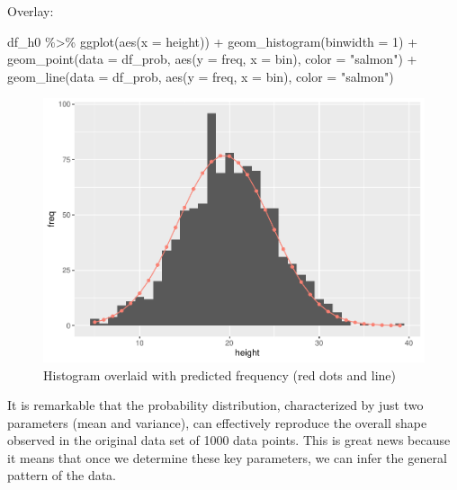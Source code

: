 \documentclass[
]{book}
\newenvironment{Shaded}{\begin{snugshade}}{\end{snugshade}}
\newcommand{\AttributeTok}[1]{\textcolor[rgb]{0.77,0.63,0.00}{#1}}
\newcommand{\DecValTok}[1]{\textcolor[rgb]{0.00,0.00,0.81}{#1}}
\newcommand{\FunctionTok}[1]{\textcolor[rgb]{0.00,0.00,0.00}{#1}}
\newcommand{\NormalTok}[1]{#1}
\newcommand{\SpecialCharTok}[1]{\textcolor[rgb]{0.00,0.00,0.00}{#1}}
\newcommand{\StringTok}[1]{\textcolor[rgb]{0.31,0.60,0.02}{#1}}
\begin{document}
Overlay:

\begin{Shaded}
\begin{Highlighting}[]
\NormalTok{df\_h0 }\SpecialCharTok{\%\textgreater{}\%} 
  \FunctionTok{ggplot}\NormalTok{(}\FunctionTok{aes}\NormalTok{(}\AttributeTok{x =}\NormalTok{ height)) }\SpecialCharTok{+} 
  \FunctionTok{geom\_histogram}\NormalTok{(}\AttributeTok{binwidth =} \DecValTok{1}\NormalTok{) }\SpecialCharTok{+}
  \FunctionTok{geom\_point}\NormalTok{(}\AttributeTok{data =}\NormalTok{ df\_prob,}
             \FunctionTok{aes}\NormalTok{(}\AttributeTok{y =}\NormalTok{ freq,}
                 \AttributeTok{x =}\NormalTok{ bin),}
             \AttributeTok{color =} \StringTok{"salmon"}\NormalTok{) }\SpecialCharTok{+}
  \FunctionTok{geom\_line}\NormalTok{(}\AttributeTok{data =}\NormalTok{ df\_prob,}
            \FunctionTok{aes}\NormalTok{(}\AttributeTok{y =}\NormalTok{ freq,}
                \AttributeTok{x =}\NormalTok{ bin),}
            \AttributeTok{color =} \StringTok{"salmon"}\NormalTok{)}
\end{Highlighting}
\end{Shaded}

\begin{figure}

{\centering \includegraphics{_main_files/figure-latex/histogram-overlaid-1} 

}

\caption{Histogram overlaid with predicted frequency (red dots and line)}\label{fig:histogram-overlaid}
\end{figure}

It is remarkable that the probability distribution, characterized by just two parameters (mean and variance), can effectively reproduce the overall shape observed in the original data set of 1000 data points. This is great news because it means that once we determine these key parameters, we can infer the general pattern of the data.
\end{document}
